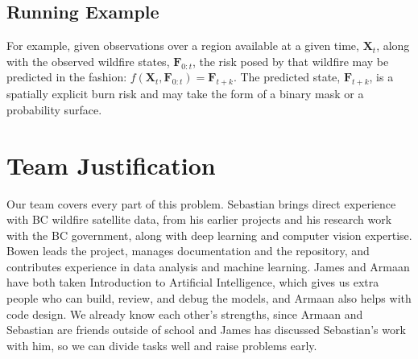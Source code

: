 \documentclass[sigconf]{acmart}
\begin{document}
\subsection{Running Example}
For example, given observations over a region available at a given time, $\mathbf{X}_t$, along with the observed wildfire states, $\mathbf{F}_{0:t}$, the risk posed by that wildfire may be predicted in the fashion: $\displaystyle{f(\mathbf{X}_{t},\mathbf{F}_{0:t}) = \mathbf{F}_{t+k}}$. The predicted state, $\mathbf{F}_{t+k}$, is a spatially explicit burn risk and may take the form of a binary mask or a probability surface. 


\section{Team Justification}
Our team covers every part of this problem. Sebastian brings direct experience with BC wildfire satellite data, from his earlier projects and his research work with the BC government, along with deep learning and computer vision expertise. Bowen leads the project, manages documentation and the repository, and contributes experience in data analysis and machine learning. James and Armaan have both taken Introduction to Artificial Intelligence, which gives us extra people who can build, review, and debug the models, and Armaan also helps with code design. We already know each other's strengths, since Armaan and Sebastian are friends outside of school and James has discussed Sebastian's work with him, so we can divide tasks well and raise problems early.



\end{document}
